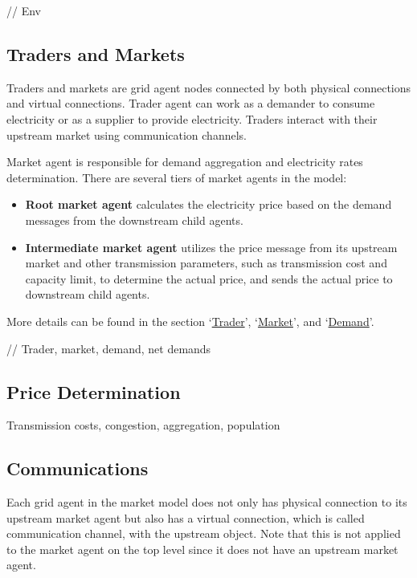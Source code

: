 \documentclass[12pt]{article}
\begin{document}
// Env

\subsection{Traders and Markets} \mbox{}

Traders and markets are grid agent nodes connected by both physical connections and virtual connections. 
Trader agent can work as a demander to consume electricity or as a supplier to provide electricity. 
Traders interact with their upstream market using communication channels. 

Market agent is responsible for demand aggregation and electricity rates determination. 
There are several tiers of market agents in the model: 
\begin{itemize}
    \item{\textbf{Root market agent}} calculates the electricity price based on the demand messages 
    from the downstream child agents. 
    \item{\textbf{Intermediate market agent}} utilizes the price message from its upstream market and 
    other transmission parameters, such as transmission cost and capacity limit, 
    to determine the actual price, and sends the actual price to downstream child agents.  
\end{itemize}

More details can be found in the section `\hyperref[subsec:objects_trader]{Trader}', 
`\hyperref[subsec:objects_market]{Market}', and `\hyperref[subsec:objects_demand]{Demand}'. 

// Trader, market, demand, net demands 

\subsection{Price Determination} \mbox{}

Transmission costs, congestion, aggregation, population

\subsection{Communications} \mbox{}

Each grid agent in the market model does not only has physical connection to 
its upstream market agent but also has a virtual connection, which is called communication channel, 
with the upstream object. 
Note that this is not applied to the market agent on the top level since it does not have an upstream market agent. 
\end{document}

